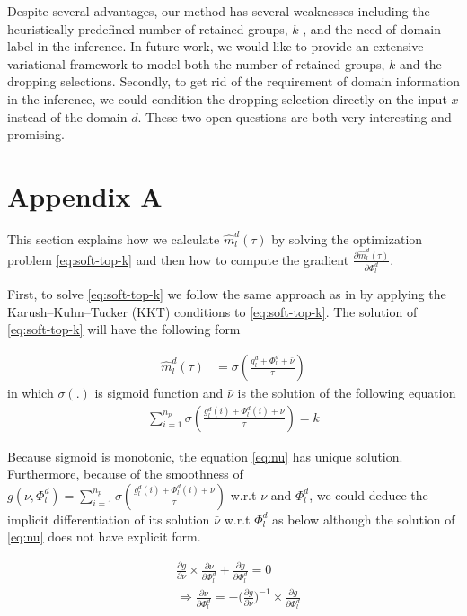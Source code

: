 \documentclass[11pt]{article}
\begin{document}
Despite several advantages, our method has several weaknesses including the heuristically predefined number of retained groups, $k$ , and the need of domain label in the inference. In future work, we would like to provide an extensive variational framework to model both the number of retained groups, $k$ and the dropping selections. Secondly, to get rid of the requirement of domain information in the inference, we could condition the dropping selection directly on the input $x$ instead of the domain $d$. These two open questions are both very interesting and promising.


\appendix
\section{Appendix A}
\label{appendix:a}
This section explains how we calculate $\hat{m}_l^d(\tau)$ by solving the optimization problem \eqref{eq:soft-top-k} and then how to compute the gradient $\frac{\partial \hat{m}_l^d(\tau)}{\partial \Phi_l^d}$.

First, to solve \eqref{eq:soft-top-k} we follow the same approach as in \cite{amos19lml,amos20differential} by applying the Karush–Kuhn–Tucker (KKT) conditions to \eqref{eq:soft-top-k}. The solution of \eqref{eq:soft-top-k} will have the following form

\begin{align}
\hat{m}_l^d(\tau) &= \sigma(\frac{g_l^d + \Phi_l^d + \bar{\nu}}{\tau}) \label{eq:soft-m}
\end{align}
in which $\sigma(.)$ is sigmoid function and $\bar{\nu}$ is the solution of the following equation
\begin{align}
\displaystyle{\mathop{\sum}_{i=1}^{n_p}} \sigma(\frac{g_l^d(i) + \Phi_l^d(i) + \nu}{\tau}) = k \label{eq:nu}
\end{align}

Because sigmoid is monotonic, the equation \eqref{eq:nu} has unique solution. Furthermore,  because of the smoothness of $g(\nu,\Phi_l^d) = \displaystyle{\mathop{\sum}_{i=1}^{n_p}} \sigma(\frac{g_l^d(i) + \Phi_l^d(i) + \nu}{\tau})$ w.r.t $\nu$ and $\Phi_l^d$, we could deduce the implicit differentiation of its solution $\bar{\nu}$ w.r.t $\Phi_l^d$ as below although the solution of \eqref{eq:nu} does not have explicit form.

\begin{align*}
&\frac{\partial g}{\partial \nu} \times \frac{\partial \nu}{\partial \Phi_l^d} + \frac{\partial g}{\partial \Phi_l^d} = 0 \\
& \Rightarrow \frac{\partial \nu}{\partial \Phi_l^d} = - \big(\frac{\partial g}{\partial \nu}\big)^{-1} \times \frac{\partial g}{\partial \Phi_l^d}
\end{align*}
\end{document}
